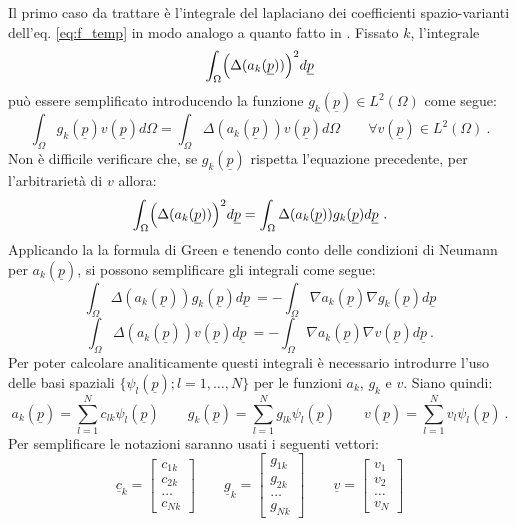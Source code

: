 \documentclass[a4paper,11pt,twoside,openright]{book}							%
\begin{document}
Il primo caso da trattare è l'integrale del laplaciano dei coefficienti spazio-varianti dell'eq. \ref{eq:f_temp} in modo analogo a quanto fatto in \cite{art:sangalli}. Fissato $k$, l'integrale
$$
\int_{\Omega} \Bigl( \Delta(  a_k(\underline p)  ) \Bigr)^2 d \underline p
$$
può essere semplificato introducendo la funzione $g_k(\underline p) \in L^2(\Omega)$ come segue:
\begin{equation}
\label{eq:ps1}
\int_\Omega g_k(\underline{p}) v(\underline{p}) d \Omega= \int_\Omega \Delta (a_k(\underline p)) v(\underline p) d \Omega\qquad \forall v(\underline{p}) \in L^2(\Omega) \ .
\end{equation}
Non è difficile verificare che, se $g_k(\underline p)$ rispetta l'equazione precedente, per l'arbitrarietà di $v$ allora:
\begin{equation}
\label{eq:ps2}
\int_{\Omega} \Bigl( \Delta(  a_k(\underline p)  ) \Bigr)^2 d \underline p = \int_{\Omega}  \Delta(  a_k(\underline p))g_k(\underline p)d \underline p \ .
\end{equation}
Applicando la la formula di Green e tenendo conto delle condizioni di Neumann per $a_k(\underline p)$, si possono semplificare gli integrali come segue:
$$
\int_{\Omega}  \Delta(  a_k(\underline p))g_k(\underline p)d \underline p \ = -\int_{\Omega} \nabla  a_k(\underline p)\nabla g_k(\underline p)d \underline p
$$
$$
\int_{\Omega}  \Delta(  a_k(\underline p))v(\underline p)d \underline p \ = -\int_{\Omega} \nabla  a_k(\underline p)\nabla v(\underline p)d \underline p \ .
$$
Per poter calcolare analiticamente questi integrali è necessario introdurre l'uso delle basi spaziali $\{ \psi_l(\underline p);l=1, \ldots , N \}$ per le funzioni $a_k$, $g_k$ e $v$. Siano quindi:
$$
a_k(\underline p)=\sum_{l=1}^N c_{lk}\psi_l(\underline p) \qquad 
g_k(\underline p)=\sum_{l=1}^N g_{lk}\psi_l(\underline p) \qquad
v(\underline p)=\sum_{l=1}^N v_{l}\psi_l(\underline p) \ .
$$
Per semplificare le notazioni saranno usati i seguenti vettori:
$$
\underline c_k =
\begin{bmatrix}
c_{1k} \\ c_{2k} \\ \hdots \\ c_{Nk}
\end{bmatrix}
\qquad
\underline g_k =
\begin{bmatrix}
g_{1k} \\ g_{2k} \\ \hdots \\ g_{Nk}
\end{bmatrix}
\qquad
\underline v =
\begin{bmatrix}
v_1 \\ v_2 \\ \hdots \\ v_N
\end{bmatrix} 
$$
\end{document}

